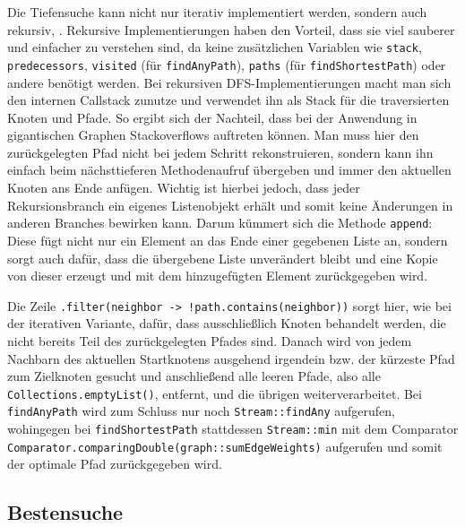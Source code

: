                 Die Tiefensuche kann nicht nur iterativ implementiert werden, sondern auch rekursiv, . Rekursive Implementierungen haben den Vorteil, dass sie viel sauberer und einfacher zu verstehen sind, da keine zusätzlichen Variablen wie \lstinline{stack}, \lstinline{predecessors}, \lstinline{visited} (für \lstinline{findAnyPath}), \lstinline{paths} (für \lstinline{findShortestPath}) oder andere benötigt werden. Bei rekursiven DFS-Implementierungen macht man sich den internen Callstack zunutze und verwendet ihn als Stack für die traversierten Knoten und Pfade. So ergibt sich der Nachteil, dass bei der Anwendung in gigantischen Graphen Stackoverflows auftreten können. Man muss hier den zurückgelegten Pfad nicht bei jedem Schritt rekonstruieren, sondern kann ihn einfach beim nächsttieferen Methodenaufruf übergeben und immer den aktuellen Knoten ans Ende anfügen. Wichtig ist hierbei jedoch, dass jeder Rekursionsbranch ein eigenes Listenobjekt erhält und somit keine Änderungen in anderen Branches bewirken kann. Darum kümmert sich die Methode \lstinline{append}: Diese fügt nicht nur ein Element an das Ende einer gegebenen Liste an, sondern sorgt auch dafür, dass die übergebene Liste unverändert bleibt und eine Kopie von dieser erzeugt und mit dem hinzugefügten Element zurückgegeben wird.
                
                Die Zeile \lstinline{.filter(neighbor -> !path.contains(neighbor))} sorgt hier, wie bei der iterativen Variante, dafür, dass ausschließlich Knoten behandelt werden, die nicht bereits Teil des zurückgelegten Pfades sind. Danach wird von jedem Nachbarn des aktuellen Startknotens ausgehend irgendein bzw. der kürzeste Pfad zum Zielknoten gesucht und anschließend alle leeren Pfade, also alle \lstinline{Collections.emptyList()}, entfernt, und die übrigen weiterverarbeitet. Bei \lstinline{findAnyPath} wird zum Schluss nur noch \lstinline{Stream::findAny} aufgerufen, wohingegen bei \lstinline{findShortestPath} stattdessen \lstinline{Stream::min} mit dem Comparator \lstinline{Comparator.comparingDouble(graph::sumEdgeWeights)} aufgerufen und somit der optimale Pfad zurückgegeben wird.
    
                

        \subsection{Bestensuche} \label{befs}

